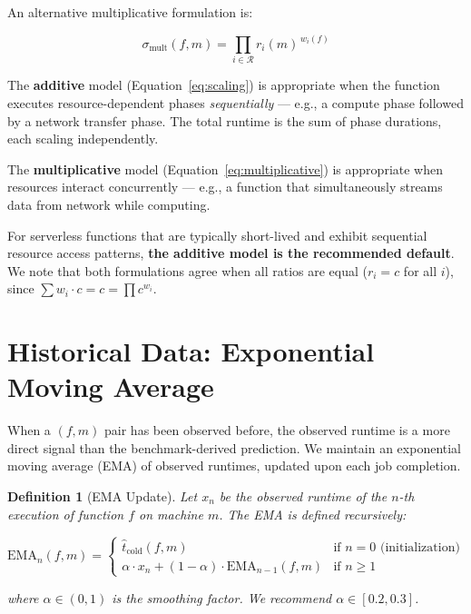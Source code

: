 \documentclass[11pt, a4paper]{article}
\newcommand{\bluecontentend}{\endgroup}
\newtheorem{definition}{Definition}
\begin{document}
An alternative multiplicative formulation is:

\begin{equation}
\label{eq:multiplicative}
    \sigma_{\mathrm{mult}}(f, m)
    = \prod_{i \in \mathcal{R}} r_i(m)^{\,w_i(f)}
\end{equation}

The \textbf{additive} model (Equation~\ref{eq:scaling}) is appropriate when the
function executes resource-dependent phases \emph{sequentially} --- e.g., a
compute phase followed by a network transfer phase. The total runtime is the
sum of phase durations, each scaling independently.

The \textbf{multiplicative} model (Equation~\ref{eq:multiplicative}) is
appropriate when resources interact concurrently --- e.g., a function that
simultaneously streams data from network while computing.

For serverless functions that are typically short-lived and exhibit sequential
resource access patterns, \textbf{the additive model is the recommended
default}. We note that both formulations agree when all ratios are equal
($r_i = c$ for all $i$), since $\sum w_i \cdot c = c = \prod c^{w_i}$.
\bluecontentend

\section{Historical Data: Exponential Moving Average}
\label{sec:ema}

When a $(f, m)$ pair has been observed before, the observed runtime is a more
direct signal than the benchmark-derived prediction. We maintain an exponential
moving average (EMA) of observed runtimes, updated upon each job completion.

\begin{definition}[EMA Update]
\label{def:ema}
Let $x_n$ be the observed runtime of the $n$-th execution of function $f$ on
machine $m$. The EMA is defined recursively:

\begin{equation}
\label{eq:ema}
    \mathrm{EMA}_n(f, m) =
    \begin{cases}
        \hat{t}_{\mathrm{cold}}(f, m) & \text{if } n = 0 \text{ (initialization)} \\[4pt]
        \alpha \cdot x_n + (1 - \alpha) \cdot \mathrm{EMA}_{n-1}(f, m) & \text{if } n \geq 1
    \end{cases}
\end{equation}

where $\alpha \in (0, 1)$ is the smoothing factor. We recommend
$\alpha \in [0.2, 0.3]$.
\end{definition}
\end{document}
